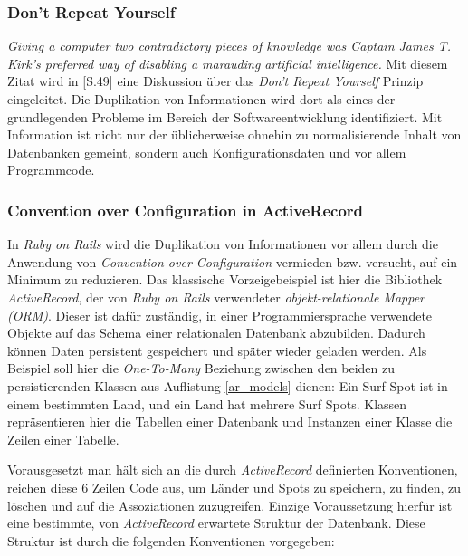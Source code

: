 \subsubsection{Don't Repeat Yourself}

\textit{Giving a computer two contradictory pieces of knowledge was
  Captain James T. Kirk's preferred way of disabling a marauding
  artificial intelligence.} Mit diesem Zitat wird in
\cite{Hunt99}[S.49] eine Diskussion über das \textit{Don't Repeat
  Yourself} Prinzip eingeleitet. Die Duplikation von Informationen
wird dort als eines der grundlegenden Probleme im Bereich der
Softwareentwicklung identifiziert. Mit Information ist nicht nur der
üblicherweise ohnehin zu normalisierende Inhalt von Datenbanken
gemeint, sondern auch Konfigurationsdaten und vor allem Programmcode.

\subsubsection{Convention over Configuration in ActiveRecord}
In \textit{Ruby on Rails} wird die Duplikation von Informationen vor
allem durch die Anwendung von \textit{Convention over Configuration}
vermieden bzw. versucht, auf ein Minimum zu reduzieren. Das klassische
Vorzeigebeispiel ist hier die Bibliothek \textit{ActiveRecord}, der
von \textit{Ruby on Rails} verwendeter \textit{objekt-relationale
  Mapper (ORM)}. Dieser ist dafür zuständig, in einer
Programmiersprache verwendete Objekte auf das Schema einer
relationalen Datenbank abzubilden. Dadurch können Daten persistent
gespeichert und später wieder geladen werden. Als Beispiel soll hier
die \textit{One-To-Many} Beziehung zwischen den beiden zu
persistierenden Klassen aus Auflistung \ref{ar_models} dienen: Ein
Surf Spot ist in einem bestimmten Land, und ein Land hat mehrere Surf
Spots. Klassen repräsentieren hier die Tabellen einer Datenbank und
Instanzen einer Klasse die Zeilen einer Tabelle.



Vorausgesetzt man hält sich an die durch \textit{ActiveRecord}
definierten Konventionen, reichen diese 6 Zeilen Code aus, um Länder
und Spots zu speichern, zu finden, zu löschen und auf die
Assoziationen zuzugreifen. Einzige Voraussetzung hierfür ist eine
bestimmte, von \textit{ActiveRecord} erwartete Struktur der
Datenbank. Diese Struktur ist durch die folgenden Konventionen
vorgegeben:

